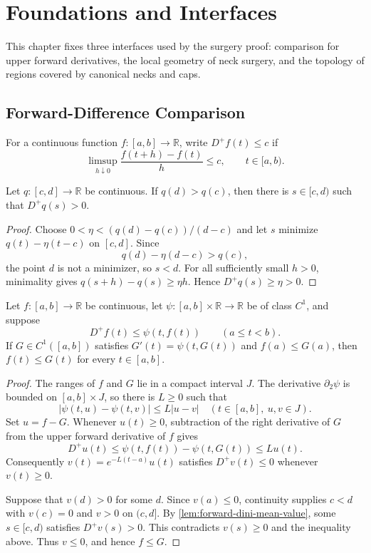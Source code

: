 \chapter{Foundations and Interfaces}

This chapter fixes three interfaces used by the surgery proof: comparison for
upper forward derivatives, the local geometry of neck surgery, and the
topology of regions covered by canonical necks and caps.

\section{Forward-Difference Comparison}

For a continuous function $f\colon[a,b]\to\mathbb R$, write
$D^+f(t)\le c$ if
\[
  \limsup_{h\downarrow0}\frac{f(t+h)-f(t)}h\le c,
  \qquad t\in[a,b).
\]

\begin{lemma}
\label{lem:forward-dini-mean-value}
\notready
Let $q\colon[c,d]\to\mathbb R$ be continuous.  If $q(d)>q(c)$, then
there is $s\in[c,d)$ such that $D^+q(s)>0$.
\end{lemma}

\begin{proof}
Choose $0<\eta<(q(d)-q(c))/(d-c)$ and let $s$ minimize
$q(t)-\eta(t-c)$ on $[c,d]$.  Since
\[
 q(d)-\eta(d-c)>q(c),
\]
the point $d$ is not a minimizer, so $s<d$.  For all sufficiently small
$h>0$, minimality gives $q(s+h)-q(s)\ge\eta h$.  Hence
$D^+q(s)\ge\eta>0$.
\end{proof}

\begin{theorem}
\label{thm:forward-dini-comparison}
\leanok
Let $f\colon[a,b]\to\mathbb R$ be continuous, let
$\psi\colon[a,b]\times\mathbb R\to\mathbb R$ be of class $C^1$, and
suppose
\[
  D^+f(t)\le \psi(t,f(t))\qquad(a\le t<b).
\]
If $G\in C^1([a,b])$ satisfies $G'(t)=\psi(t,G(t))$ and
$f(a)\le G(a)$, then $f(t)\le G(t)$ for every $t\in[a,b]$.
\end{theorem}

\begin{proof}
The ranges of $f$ and $G$ lie in a compact interval $J$.  The derivative
$\partial_2\psi$ is bounded on $[a,b]\times J$, so there is $L\ge0$ such
that
\[
 |\psi(t,u)-\psi(t,v)|\le L|u-v|
 \quad(t\in[a,b],\ u,v\in J).
\]
Set $u=f-G$.  Whenever $u(t)\ge0$, subtraction of the right derivative of
$G$ from the upper forward derivative of $f$ gives
\[
 D^+u(t)\le \psi(t,f(t))-\psi(t,G(t))\le Lu(t).
\]
Consequently $v(t)=e^{-L(t-a)}u(t)$ satisfies $D^+v(t)\le0$ whenever
$v(t)\ge0$.

Suppose that $v(d)>0$ for some $d$.  Since $v(a)\le0$, continuity supplies
$c<d$ with $v(c)=0$ and $v>0$ on $(c,d]$.  By
\ref{lem:forward-dini-mean-value}, some $s\in[c,d)$ satisfies
$D^+v(s)>0$.  This contradicts $v(s)\ge0$ and the inequality above.
Thus $v\le0$, and hence $f\le G$.
\end{proof}

